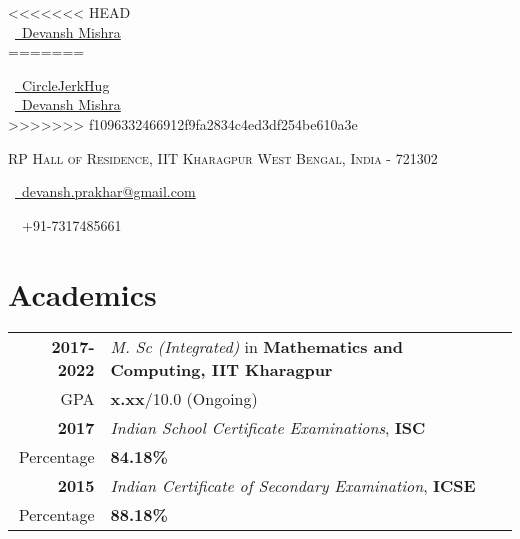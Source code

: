 \documentclass[a4paper,10pt]{extarticle} %
\begin{document}
\pagestyle{empty} %


\begin{multicols}{3}
<<<<<<< HEAD
\normalsize {}\\
\normalsize  \faLinkedin\ {\href{https://www.linkedin.com/in/devansh-mishra-b3040453/}{\ Devansh Mishra}}\\
=======

\normalsize \faGithub\ {\href{https://github.com/CircleJerkHug}{\    CircleJerkHug}}\\
\normalsize  \faLinkedinSquare\ {\href{https://www.linkedin.com/in/devansh-mishra-b3040453/}{\ Devansh Mishra}}\\
>>>>>>> f1096332466912f9fa2834c4ed3df254be610a3e
\columnbreak
\normalsize\par{\centering{\huge\textsc{\textcolor{primary}{Devansh Mishra}}}\par} %
\par{\centering\normalsize {\textsc{RP Hall of Residence, IIT Kharagpur    West Bengal, India - 721302}}\hfill\par}
\columnbreak
\raggedright\hfill\normalsize \faEnvelope\ {\href{mailto:devansh.prakhar@gmail.com}{\  devansh.prakhar@gmail.com}}\\
\raggedright\hfill{\faPhone\ \  +91-7317485661}
\end{multicols}
\vspace{-0.4 cm}


\vspace{-0.4cm}
\section{\textcolor{primary}{Academics}}

\begin{tabular}{r|p{17.5cm}}	
\textbf{2017-2022} & \textit{M. Sc (Integrated)} in \textbf{Mathematics and Computing, IIT Kharagpur}\\
\hfill GPA & \textbf{x.xx}/10.0 (Ongoing)\\
\textbf{2017} & \textit{Indian School Certificate Examinations}, \textbf{ISC}\\
\hfill Percentage & \textbf{84.18\%}\\
\textbf{2015} & \textit{Indian Certificate of Secondary Examination}, \textbf{ICSE}\\
\hfill Percentage & \textbf{88.18\%} \\
\end{tabular}
\end{document}
